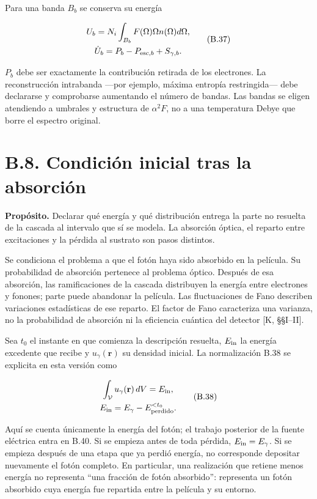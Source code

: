 \documentclass[
  spanish,
  10pt,
  a4paper,
]{article}
\newcounter{none} %
\begin{document}
Para una banda \(B_b\) se conserva su energía

\[
\begin{gathered}
U_b=N_i\int_{B_b}F(\Omega)\Omega n(\Omega)d\Omega,\\
\dot U_b=P_b-P_{{\rm esc},b}+S_{\gamma,b}.
\end{gathered} \tag{B.37}
\]

\(P_b\) debe ser exactamente la contribución retirada de los electrones.
La reconstrucción intrabanda ---por ejemplo, máxima entropía
restringida--- debe declararse y comprobarse aumentando el número de
bandas. Las bandas se eligen atendiendo a umbrales y estructura de
\(\alpha^2F\), no a una temperatura Debye que borre el espectro
original.

\section{B.8. Condición inicial tras la
absorción}\label{b.8.-condiciuxf3n-inicial-tras-la-absorciuxf3n}

\textbf{Propósito.} Declarar qué energía y qué distribución entrega la
parte no resuelta de la cascada al intervalo que sí se modela. La
absorción óptica, el reparto entre excitaciones y la pérdida al sustrato
son pasos distintos.

Se condiciona el problema a que el fotón haya sido absorbido en la
película. Su probabilidad de absorción pertenece al problema óptico.
Después de esa absorción, las ramificaciones de la cascada distribuyen
la energía entre electrones y fonones; parte puede abandonar la
película. Las fluctuaciones de Fano describen variaciones estadísticas
de ese reparto. El factor de Fano caracteriza una varianza, no la
probabilidad de absorción ni la eficiencia cuántica del detector {[}K,
§§I--II{]}.

Sea \(t_0\) el instante en que comienza la descripción resuelta,
\(E_{\rm in}\) la energía excedente que recibe y \(u_\gamma(\mathbf r)\)
su densidad inicial. La normalización B.38 se explicita en esta versión
como

\[
\begin{gathered}
\int_{\mathcal V}u_\gamma(\mathbf r)\,dV=E_{\rm in},\\
E_{\rm in}=E_\gamma-E_{\rm perdido}^{<t_0}.
\end{gathered} \tag{B.38}
\]

Aquí se cuenta únicamente la energía del fotón; el trabajo posterior de
la fuente eléctrica entra en B.40. Si se empieza antes de toda pérdida,
\(E_{\rm in}=E_\gamma\). Si se empieza después de una etapa que ya
perdió energía, no corresponde depositar nuevamente el fotón completo.
En particular, una realización que retiene menos energía no representa
``una fracción de fotón absorbido'': representa un fotón absorbido cuya
energía fue repartida entre la película y su entorno.
\end{document}
